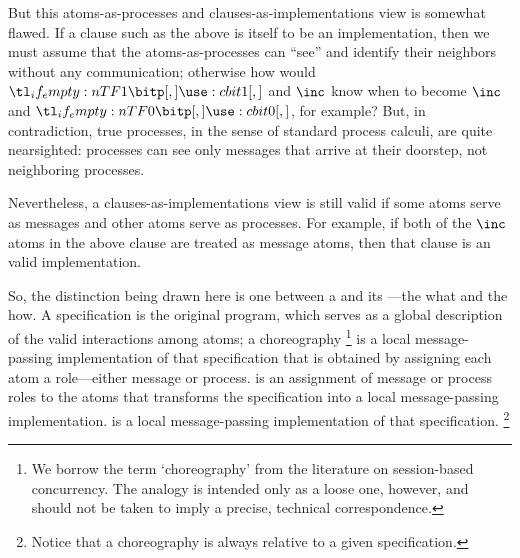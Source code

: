 \documentclass[
  class=../hdeyoung-proposal,
  crop=false
]{standalone}
\begin{document}
But this atoms-as-processes and clauses-as-implementations view is somewhat flawed.
If a clause such as the above is itself to be an implementation, then we must assume that the atoms-as-processes can \enquote{see} and identify their neighbors without any communication; otherwise how would $\bit{1}$ and $\inc$ know when to become $\inc$ and $\bit{0}$, for example?
But, in contradiction, true processes, in the sense of standard process calculi, are quite nearsighted:
processes can see only messages that arrive at their doorstep, not neighboring processes.

Nevertheless, a clauses-as-implementations view is still valid if some atoms serve as messages and other atoms serve as processes.
For example, if both of the $\inc$ atoms in the above clause are treated as message atoms, then that clause is an valid implementation.


So, the distinction being drawn here is one between a  and its ---the what and the how.
A specification is the original program, which serves as a global description of the valid interactions among atoms; a choreography%
\footnote{We borrow the term \enquote*{choreography} from the literature on session-based concurrency.
The analogy is intended only as a loose one, however, and should not be taken to imply a precise, technical correspondence.}
is a local message-passing implementation of that specification that is obtained by assigning each atom a role---either message or process.
is an assignment of message or process roles to the atoms that transforms the specification into a local message-passing implementation.
is a local message-passing implementation of that specification.%
\footnote{Notice that a choreography is always relative to a given specification.}
\end{document}
